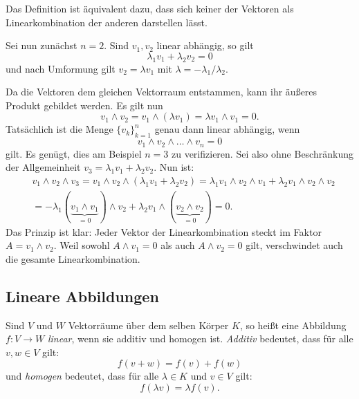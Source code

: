 \documentclass[a4paper,11pt,fleqn,twoside]{scrartcl}
\numberwithin{equation}{section}
\newcommand{\strong}[1]{{\sf\bfseries #1}}
\newenvironment{Definition}{\par\noindent\strong{Definition.}}{\par}
\begin{document}
Das Definition ist äquivalent dazu, dass sich keiner der Vektoren
als Linearkombination der anderen darstellen lässt.

Sei nun zunächst $n=2$. Sind $v_1,v_2$ linear abhängig, so gilt
\begin{equation}
\lambda_1 v_1+\lambda_2 v_2 = 0
\end{equation}
und nach Umformung gilt $v_2=\lambda v_1$ mit
$\lambda=-\lambda_1/\lambda_2$.

Da die Vektoren dem gleichen Vektorraum entstammen, kann ihr
äußeres Produkt gebildet werden. Es gilt nun
\begin{equation}
v_1\wedge v_2 = v_1\wedge (\lambda v_1) = \lambda v_1\wedge v_1 = 0.
\end{equation}
Tatsächlich ist die Menge $\{v_k\}_{k=1}^n$ genau dann linear
abhängig, wenn
\begin{equation}
v_1\wedge v_2\wedge\ldots\wedge v_n = 0
\end{equation}
gilt. Es genügt, dies am Beispiel $n=3$ zu verifizieren. Sei also
ohne Beschränkung der Allgemeinheit $v_3=\lambda_1 v_1+\lambda_2 v_2$.
Nun ist:
\begin{align}
&v_1\wedge v_2\wedge v_3
= v_1\wedge v_2\wedge(\lambda_1 v_1+\lambda_2 v_2)
= \lambda_1 v_1\wedge v_2\wedge v_1
+ \lambda_2 v_1\wedge v_2\wedge v_2\\
&= -\lambda_1 (\underbrace{v_1\wedge v_1}_{=0})\wedge v_2
+ \lambda_2 v_1\wedge (\underbrace{v_2\wedge v_2}_{=0})
= 0.
\end{align}
Das Prinzip ist klar: Jeder Vektor der Linearkombination steckt
im Faktor $A=v_1\wedge v_2$. Weil sowohl $A\wedge v_1=0$ als auch
$A\wedge v_2=0$ gilt, verschwindet auch die gesamte Linearkombination.

\subsection{Lineare Abbildungen}

\begin{Definition}
Sind $V$ und $W$ Vektorräume über dem selben Körper $K$, so heißt
eine Abbildung $f\colon V\to W$ \emph{linear}, wenn sie additiv
und homogen ist. \emph{Additiv} bedeutet, dass für alle $v,w\in V$
gilt:
\begin{equation}
f(v+w) = f(v)+f(w)
\end{equation}
und \emph{homogen} bedeutet, dass für alle $\lambda\in K$ und $v\in V$
gilt:
\begin{equation}
f(\lambda v) = \lambda f(v).
\end{equation}
\end{Definition}
\end{document}
